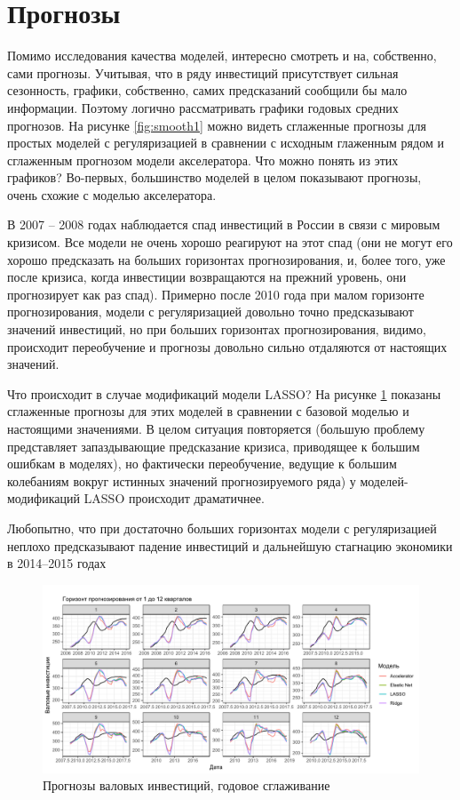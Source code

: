 \section{Прогнозы}
Помимо исследования качества моделей, интересно смотреть и на, собственно, сами прогнозы. Учитывая, что в ряду инвестиций присутствует сильная сезонность, графики, собственно, самих предсказаний сообщили бы мало информации. Поэтому логично рассматривать графики годовых средних прогнозов. На рисунке \ref{fig:smooth1} можно видеть сглаженные прогнозы для простых моделей с регуляризацией в сравнении с исходным глаженным рядом и сглаженным прогнозом модели акселератора. Что можно понять из этих графиков? Во-первых, большинство моделей в целом показывают прогнозы, очень схожие с моделью акселератора.

В 2007 -- 2008 годах наблюдается спад инвестиций в России в связи с мировым кризисом. Все модели не очень хорошо реагируют на этот спад (они не могут его хорошо предсказать на больших горизонтах прогнозирования, и, более того, уже после кризиса, когда инвестиции возвращаются на прежний уровень, они прогнозирует как раз спад). Примерно после 2010 года при малом горизонте прогнозирования, модели с регуляризацией довольно точно предсказывают значений инвестиций, но при больших горизонтах прогнозирования, видимо, происходит переобучение и прогнозы довольно сильно отдаляются от настоящих значений.


Что происходит в случае модификаций модели LASSO? На рисунке \ref{fig:smooth2} показаны сглаженные прогнозы для этих моделей в сравнении с базовой моделью и настоящими значениями. В целом ситуация повторяется (большую проблему представляет запаздывающие предсказание кризиса, приводящее к большим ошибкам в моделях), но фактически переобучение, ведущие к большим колебаниям вокруг истинных значений прогнозируемого ряда) у моделей-модификаций LASSO происходит драматичнее.


Любопытно, что при достаточно больших горизонтах модели с регуляризацией неплохо предсказывают падение инвестиций и дальнейшую стагнацию экономики в 2014--2015 годах
\begin{figure}[h]
    \centering
    \includegraphics[width = \textwidth]{smooth1.pdf}
    \caption{Прогнозы валовых инвестиций, годовое сглаживание}
    \label{fig:smooth2}
\end{figure}

